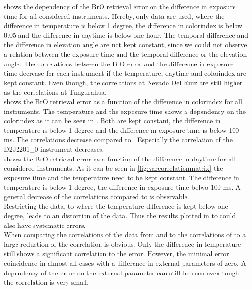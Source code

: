 \documentclass  [
  paper    = a4,
  BCOR     = 10mm,
  twoside,
  fontsize = 12pt,
  fleqn,
  toc      = bibnumbered,
  toc      = listofnumbered,
  numbers  = noendperiod,
  headings = normal,
  listof   = leveldown,
  version  = 3.03
]                                       {scrreprt}
\begin{document}
	 shows the dependency of the BrO retrieval error on the difference in exposure time for all considered instruments. Hereby, only data are used, where the difference in temperature is below 1 degree, the difference in colorindex is below 0.05 and the difference in daytime is below one hour. The temporal difference and the difference in elevation angle are not kept constant, since we could not observe a relation between the exposure time and the temporal difference or the elevation angle. The correlations between the BrO error and the difference in exposure time decrease for each instrument if the temperature, daytime and colorindex are kept constant. Even though, the correlations at Nevado Del Ruiz are still higher as the correlations at Tungurahua.\\
	 shows the BrO retrieval error as a function of the difference in colorindex for all instruments. The temperature and the exposure time shows a dependency on the colorindex as it can be seen in . Both are kept constant, the difference in temperature is below 1 degree and the difference in exposure time is below 100 ms. The correlations decrease compared to . Especially the correlation of the D2J2201\_0 instrument decreases.\\
	 shows the BrO retrieval error as a function of the difference in daytime for all considered instruments. As it can be seen in \cref{fig:varcorrelationmatrix} the exposure time and the temperature need to be kept constant. The difference in temperature is below 1 degree, the difference in exposure time belwo 100 ms. A general decrease of the correlations compared to  is observable.\\
	Restricting the data, to where the temperature difference is kept below one degree, leads to an distortion of the data. Thus the results plotted in  to  could also have systematic errors.\\
	When comparing the correlations of the data from  and   to the correlations of 
	 to  a large reduction of the correlation is obvious. Only the difference in temperature still shows a significant correlation to the   error. However, the minimal   error coincidence in almost all cases with a difference in external parameters of zero. A dependency of the   error on the external parameter can still be seen even tough the correlation is very small. \\
\end{document}
